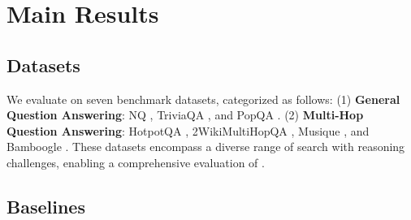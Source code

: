 
\section{Main Results}


\subsection{Datasets}


We evaluate \Ours on seven benchmark datasets, categorized as follows:
%
(1) \textbf{General Question Answering}: NQ \citep{kwiatkowski2019natural}, TriviaQA \citep{joshi2017triviaqa}, and PopQA \citep{mallen2022not}.
(2) \textbf{Multi-Hop Question Answering}: HotpotQA \citep{yang2018hotpotqa}, 2WikiMultiHopQA \citep{ho2020constructing}, Musique \citep{trivedi2022musique}, and Bamboogle \citep{press2022measuring}.
These datasets encompass a diverse range of search with reasoning challenges, enabling a comprehensive evaluation of \Ours. %

\subsection{Baselines}


